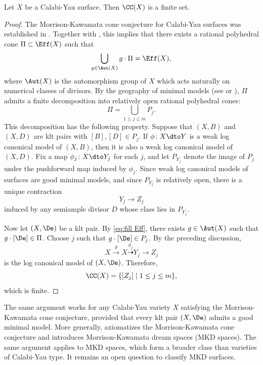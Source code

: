 \documentclass[12pt]{amsart}
\begin{document}
\begin{theorem}\label{thm:finite lc models for CY}
  Let $X$ be a Calabi-Yau surface. Then $\CC(X)$ is a finite set.
\end{theorem}
\begin{proof}
  The Morrison-Kawamata cone conjecture for Calabi-Yau surfaces was
established in \cite[Theorem~4.1]{Tot10}. Together with
\cite[Theorem~1.4]{GLSW24}, this implies that there exists a rational
polyhedral cone $\Pi\subset\Eff(X)$ such that
  \begin{equation}\label{eq:fill Eff}
     \bigcup_{g\in \Aut(X)} g\cdot \Pi = \Eff(X),
  \end{equation} where $\Aut(X)$ is the automorphism group of $X$ which acts naturally on numerical classes of divisors. By the geography of minimal models (see \cite[Theorem~3.4]{SC11} or \cite[Theorem~2.7]{LZ25}),
$\Pi$ admits a finite decomposition into relatively open rational
polyhedral cones:
\[
\Pi=\bigcup_{1\leq j\leq m}P_j.
\]
This decomposition has the following property. Suppose that $(X,B)$
and $(X,D)$ are klt pairs with $[B],[D]\in P_j$. If
$\phi\colon X\dto Y$ is a weak log canonical model of $(X,B)$, then it
is also a weak log canonical model of $(X,D)$. Fix a map $\phi_j\colon X\dto Y_j$ for each $j$, and let $P_{Y_j}$
denote the image of $P_j$ under the pushforward map induced by
$\phi_j$. Since weak log canonical models of surfaces are good minimal
models,  and since $P_{Y_j}$ is relatively open, there is
a unique contraction
\[
Y_j\to Z_j
\]
induced by any semiample divisor $D$ whose class lies in $P_{Y_j}$.

 Now let $(X,\De)$ be a klt pair. By \eqref{eq:fill Eff}, there exists
$g\in\Aut(X)$ such that $g\cdot[\De]\in\Pi$. Choose $j$ such that
$g\cdot[\De]\in P_j$. By the preceding discussion,
  \[X \xrightarrow{g} X \overset{\phi_j}{\dashrightarrow}Y_j \to Z_{j}\] is the log canonical model of $(X, \De)$. Therefore, 
  \[\CC(X)=\{[Z_{j}]\mid 1 \leq j\leq m\},\] which is finite.
\end{proof}

\begin{remark}
The same argument works for any Calabi-Yau variety $X$ satisfying
the Morrison-Kawamata cone conjecture, provided that every klt pair
$(X,\De)$ admits a good minimal model. More generally, \cite{CLLZ25}
axiomatizes the Morrison-Kawamata cone conjecture and introduces
Morrison-Kawamata dream spaces (MKD spaces). The same argument applies
to MKD spaces, which form a broader class than varieties of
Calabi-Yau type. It remains an open question to classify MKD surfaces.
\end{remark}
\end{document}
